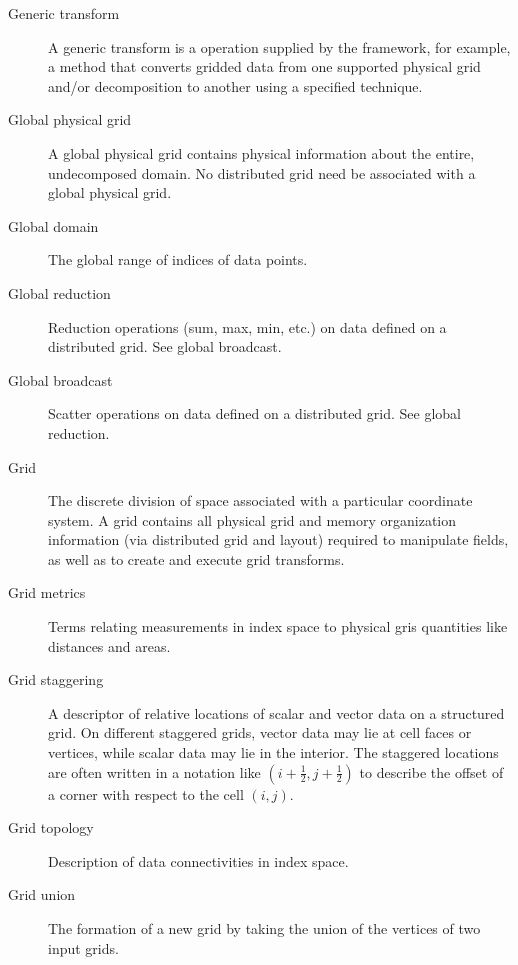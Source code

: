 \begin{description}
\item[Generic transform] \label{glos:GenericTrans} A generic transform 
  is a operation supplied by the framework, for example, a method 
  that converts gridded data from one supported physical grid and/or 
  decomposition to another using a specified technique.  

\item[Global physical grid] \label{glos:GlobPhysGrid} 
  A global physical grid contains physical information about the entire, 
  undecomposed domain.  No distributed grid need be associated with a global 
  physical grid.  

\item[Global domain] \label{glos:GlobDomain}
  The global range of indices of data points.

\item[Global reduction] \label{glos:GlobReduction} 
  Reduction operations (sum, max, min, etc.) on
  data defined on a distributed grid.  See global broadcast.

\item[Global broadcast] \label{glos:GlobBroadcast}
  Scatter operations on data defined on a distributed grid.
  See global reduction.

\item[Grid] \label{glos:Grid} The discrete division of space associated with
  a particular coordinate system.  A grid contains all physical grid and memory 
  organization information (via distributed grid and layout) required to manipulate 
  fields, as well as to create and execute grid transforms. 

\item[Grid metrics] \label{glos:GridMetrics} Terms relating measurements 
  in index space to physical gris quantities like distances and areas.

\item[Grid staggering] \label{glos:GridStagger} 
  A descriptor of relative locations
  of scalar and vector data on a structured grid. On different
  staggered grids, vector data may lie at cell faces or vertices,
  while scalar data may lie in the interior. The staggered locations
  are often written in a notation like $(i+\frac12,j+\frac12)$ to
  describe the offset of a corner with respect to the cell $(i,j)$.

\item[Grid topology] \label{glos:GridTopo} Description of data 
  connectivities in index space.

\item[Grid union] \label{glos:GridUnion} The formation of a new grid
  by taking the union of the vertices of two input grids. 


\end{description}
